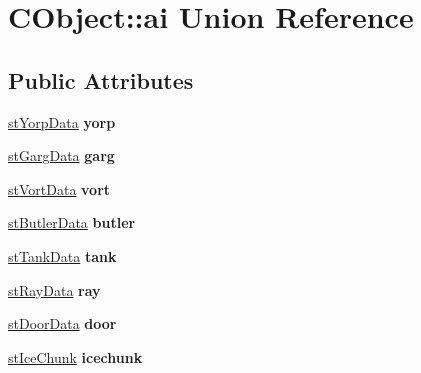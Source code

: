 \hypertarget{union_c_object_1_1ai}{
\section{CObject::ai Union Reference}
\label{union_c_object_1_1ai}
}
\subsection*{Public Attributes}
\begin{DoxyCompactItemize}
\item 
\hypertarget{union_c_object_1_1ai_a1e049c217ac0a3c20d43e75e87636caa}{
\hyperlink{structst_yorp_data}{stYorpData} {\bfseries yorp}}
\label{union_c_object_1_1ai_a1e049c217ac0a3c20d43e75e87636caa}

\item 
\hypertarget{union_c_object_1_1ai_a3e9c5ce61241d3a744219ab73924172b}{
\hyperlink{structst_garg_data}{stGargData} {\bfseries garg}}
\label{union_c_object_1_1ai_a3e9c5ce61241d3a744219ab73924172b}

\item 
\hypertarget{union_c_object_1_1ai_a3b94e5ce01dadcaf9d6cf825219f0142}{
\hyperlink{structst_vort_data}{stVortData} {\bfseries vort}}
\label{union_c_object_1_1ai_a3b94e5ce01dadcaf9d6cf825219f0142}

\item 
\hypertarget{union_c_object_1_1ai_ae5e7cc6c768bc31538981684862343f3}{
\hyperlink{structst_butler_data}{stButlerData} {\bfseries butler}}
\label{union_c_object_1_1ai_ae5e7cc6c768bc31538981684862343f3}

\item 
\hypertarget{union_c_object_1_1ai_a3a462db45b771ad03df8e51a5a6ba167}{
\hyperlink{structst_tank_data}{stTankData} {\bfseries tank}}
\label{union_c_object_1_1ai_a3a462db45b771ad03df8e51a5a6ba167}

\item 
\hypertarget{union_c_object_1_1ai_ab1a7203f1f5071c4a87a17330f544f1e}{
\hyperlink{structst_ray_data}{stRayData} {\bfseries ray}}
\label{union_c_object_1_1ai_ab1a7203f1f5071c4a87a17330f544f1e}

\item 
\hypertarget{union_c_object_1_1ai_a6dd9d34691fa46d5d4079c3745623f8d}{
\hyperlink{structst_door_data}{stDoorData} {\bfseries door}}
\label{union_c_object_1_1ai_a6dd9d34691fa46d5d4079c3745623f8d}

\item 
\hypertarget{union_c_object_1_1ai_a8f380acb6afe8396996624a908ba64fe}{
\hyperlink{structst_ice_chunk}{stIceChunk} {\bfseries icechunk}}
\label{union_c_object_1_1ai_a8f380acb6afe8396996624a908ba64fe}


\end{DoxyCompactItemize}
